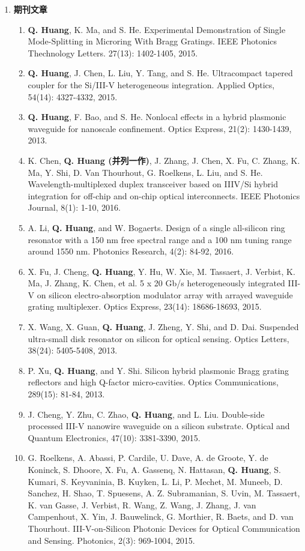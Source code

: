 \begin{publications}
\begin{enumerate}[]
	\item \textbf{期刊文章}
	\begin{enumerate}[1.]
		\item \textbf{Q. Huang}, K. Ma, and S. He. Experimental Demonstration of Single Mode-Splitting in Microring With Bragg Gratings. IEEE Photonics Thechnology Letters. 27(13): 1402-1405, 2015.
		\item \textbf{Q. Huang}, J. Chen, L. Liu, Y. Tang, and S. He. Ultracompact tapered coupler for the Si/III-V heterogeneous integration. Applied Optics, 54(14): 4327-4332, 2015.
		\item \textbf{Q. Huang}, F. Bao, and S. He. Nonlocal effects in a hybrid plasmonic waveguide for nanoscale confinement. Optics Express, 21(2): 1430-1439, 2013.
		\item K. Chen, \textbf{Q. Huang (并列一作)}, J. Zhang, J. Chen, X. Fu, C. Zhang, K. Ma, Y. Shi, D. Van Thourhout, G. Roelkens, L. Liu, and S. He. Wavelength-multiplexed duplex transceiver based on IIIV/Si hybrid integration for off-chip 
		and on-chip optical interconnects. IEEE Photonics Journal, 8(1): 1-10, 2016. 		
		\item A. Li, \textbf{Q. Huang}, and W. Bogaerts. Design of a single all-silicon ring resonator with a 150 nm free spectral range and a 100 nm tuning range around 1550 nm. Photonics Research, 4(2): 84-92, 2016.
		\item X. Fu, J. Cheng, \textbf{Q. Huang}, Y. Hu, W. Xie, M. Tassaert, J. Verbist, K. Ma, J. Zhang, K. Chen, et al. 5 x 20 Gb/s heterogeneously integrated III-V on silicon electro-absorption modulator array with arrayed waveguide grating multiplexer. Optics Express, 23(14): 18686-18693, 2015.
		\item X. Wang, X. Guan,\textbf{ Q. Huang}, J. Zheng, Y. Shi, and D. Dai. Suspended ultra-small disk resonator on silicon for optical sensing. Optics Letters, 38(24): 5405-5408, 2013.
		\item P. Xu, \textbf{Q. Huang}, and Y. Shi. Silicon hybrid plasmonic Bragg grating reflectors and high Q-factor micro-cavities. Optics Communications, 289(15): 81-84, 2013.
		\item J. Cheng, Y. Zhu, C. Zhao,\textbf{ Q. Huang}, and L. Liu. Double-side processed III-V nanowire waveguide on a silicon substrate. Optical and Quantum Electronics, 47(10): 3381-3390, 2015.
		\item G. Roelkens, A. Abassi, P. Cardile, U. Dave, A. de Groote, Y. de Koninck, S. Dhoore, X. Fu, A. Gassenq, N. Hattasan, \textbf{Q. Huang}, S. Kumari, S. Keyvaninia, B. Kuyken, L. Li, P. Mechet, M. Muneeb, D. Sanchez, H. Shao, T. Spuesens, A. Z. Subramanian, S. Uvin, M. Tassaert, K. van Gasse, J. Verbist, R. Wang, Z. Wang, J. Zhang, J. van Campenhout, X. Yin, J. Bauwelinck, G. Morthier, R. Baets, and D. van Thourhout. III-V-on-Silicon Photonic Devices for Optical Communication and Sensing. Photonics, 2(3): 969-1004, 2015.

\end{enumerate}
\end{enumerate}
\end{publications}
